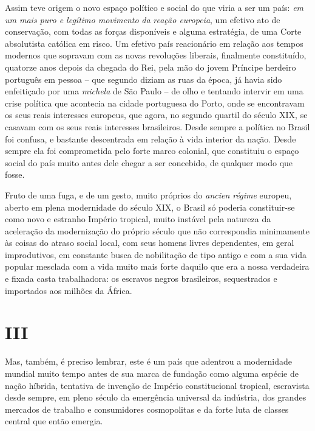Assim teve origem o novo espaço político e social do que viria a ser um
país: \emph{em um mais puro e legítimo movimento} \emph{da} \emph{reação
europeia}, um efetivo ato de conservação, com todas as forças
disponíveis e alguma estratégia, de uma Corte absolutista católica em
risco. Um efetivo país reacionário em relação aos tempos modernos que
sopravam com as novas revoluções liberais, finalmente constituído,
quatorze anos depois da chegada do Rei, pela mão do jovem Príncipe
herdeiro português em pessoa -- que segundo diziam as ruas da época, já
havia sido enfeitiçado por uma \emph{michela} de São Paulo -- de olho e
tentando intervir em uma crise política que acontecia na cidade
portuguesa do Porto, onde se encontravam os seus reais interesses
europeus, que agora, no segundo quartil do século XIX, se casavam com os
seus reais interesses brasileiros. Desde sempre a política no Brasil foi
confusa, e bastante descentrada em relação à vida interior da nação.
Desde sempre ela foi comprometida pelo forte marco colonial, que
constituiu o espaço social do país muito antes dele chegar a ser
concebido, de qualquer modo que fosse.

Fruto de uma fuga, e de um gesto, muito próprios do \emph{ancien régime}
europeu, aberto em plena modernidade do século XIX, o Brasil só poderia
constituir-se como novo e estranho Império tropical, muito instável pela
natureza da aceleração da modernização do próprio século que não
correspondia minimamente às coisas do atraso social local, com seus
homens livres dependentes, em geral improdutivos, em constante busca de
nobilitação de tipo antigo e com a sua vida popular mesclada com a vida
muito mais forte daquilo que era a nossa verdadeira e fixada casta
trabalhadora: os escravos negros brasileiros, sequestrados e importados
aos milhões da África.

\section{III}

Mas, também, é preciso lembrar, este é um país que adentrou a
modernidade mundial muito tempo antes de sua marca de fundação como
alguma espécie de nação híbrida, tentativa de invenção de Império
constitucional tropical, escravista desde sempre, em pleno século da
emergência universal da indústria, dos grandes mercados de trabalho e
consumidores cosmopolitas e da forte luta de classes central que então
emergia.


